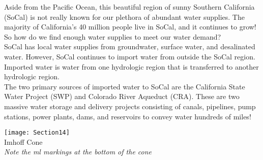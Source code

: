 \documentclass{article}
\begin{document}
Aside from the Pacific Ocean, this beautiful region of sunny Southern California (SoCal) is not really known for our plethora of abundant water supplies.  The majority of California's 40 million people live in SoCal, and it continues to grow!   So how do we find enough water supplies to meet our water demand?\\
\vspace{1cm}
SoCal has local water supplies from groundwater, surface water, and desalinated water.  However, SoCal continues to import water from outside the SoCal region.  Imported water is water from one hydrologic region that is transferred to another hydrologic region.\\

\vspace{1cm}
The two primary sources of imported water to SoCal are the California State Water Project (SWP) and Colorado River Aqueduct (CRA).  These are two massive water storage and delivery projects consisting of canals, pipelines, pump stations, power plants, dams, and reservoirs to convey water hundreds of miles!\\

			      	\begin{center}
			      		\texttt{[image: Section14]}\\
			      		Imhoff Cone\\
			      		\textit{Note the ml markings at the bottom of the cone}
			      		
			      		
			      	\end{center}
\end{document}
